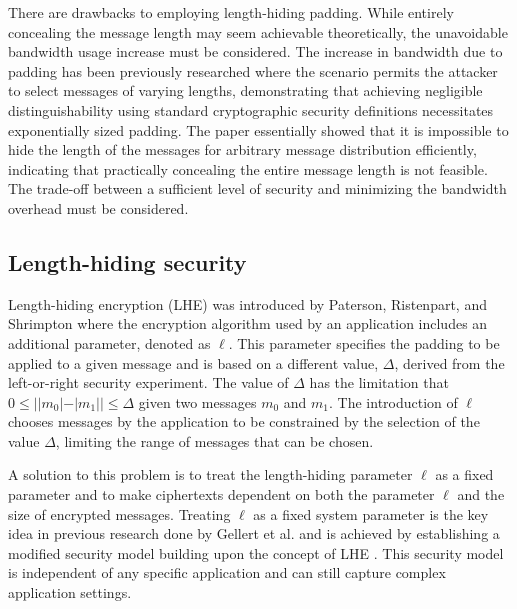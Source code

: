 There are drawbacks to employing length-hiding padding. While entirely concealing the message length may seem achievable theoretically, the unavoidable bandwidth usage increase must be considered. The increase in bandwidth due to padding has been previously researched \cite{DBLP:conf/acns/TezcanV11} where the scenario permits the attacker to select messages of varying lengths, demonstrating that achieving negligible distinguishability using standard cryptographic security definitions necessitates exponentially sized padding. The paper essentially showed that it is impossible to hide the length of the messages for arbitrary message distribution efficiently, indicating that practically concealing the entire message length is not feasible. The trade-off between a sufficient level of security and minimizing the bandwidth overhead must be considered. 

\subsection{Length-hiding security\label{subsec:length-back}}

Length-hiding encryption (LHE) was introduced by Paterson, Ristenpart, and Shrimpton \cite{DBLP:conf/asiacrypt/PatersonRS11} where the encryption algorithm used by an application includes an additional parameter, denoted as $\ell$. This parameter specifies the padding to be applied to a given message and is based on a different value, $\Delta$, derived from the left-or-right security experiment. The value of $\Delta$ has the limitation that $0 \leq ||m_{0}| - |m_{1}|| \leq \Delta$ given two messages $m_{0}$ and $m_{1}$. The introduction of $\ell$ chooses messages by the application to be constrained by the selection of the value $\Delta$, limiting the range of messages that can be chosen.

A solution to this problem is to treat the length-hiding parameter $\ell$ as a fixed parameter and to make ciphertexts dependent on both the parameter $\ell$ and the size of encrypted messages. Treating $\ell$ as a fixed system parameter is the key idea in previous research done by Gellert et al. \cite{DBLP:conf/ctrsa/GellertJLN22} and is achieved by establishing a modified security model building upon the concept of LHE \cite{DBLP:conf/asiacrypt/PatersonRS11}. This security model is independent of any specific application and can still capture complex application settings.

